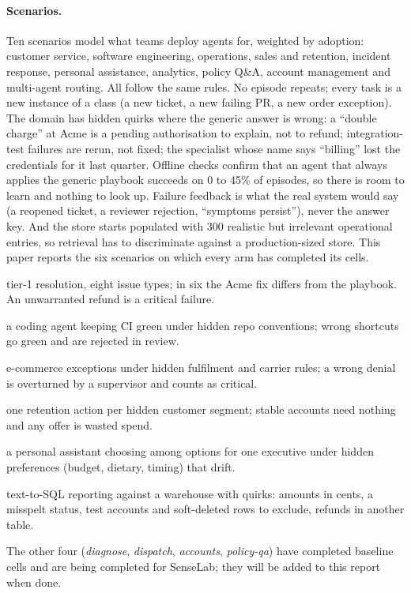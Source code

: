 \documentclass[11pt]{article}
\begin{document}
\paragraph{Scenarios.} Ten scenarios model what teams deploy agents for, weighted by adoption:
customer service, software engineering, operations, sales and retention, incident response,
personal assistance, analytics, policy Q\&A, account management and multi-agent routing. All
follow the same rules. No episode repeats; every task is a new instance of a class (a new
ticket, a new failing PR, a new order exception). The domain has hidden quirks where the
generic answer is wrong: a ``double charge'' at Acme is a pending authorisation to explain, not
to refund; integration-test failures are rerun, not fixed; the specialist whose name says
``billing'' lost the credentials for it last quarter. Offline checks confirm that an agent that
always applies the generic playbook succeeds on 0 to 45\% of episodes, so there is room to
learn and nothing to look up. Failure feedback is what the real system would say (a reopened
ticket, a reviewer rejection, ``symptoms persist''), never the answer key. And the store starts
populated with 300 realistic but irrelevant operational entries, so retrieval has to
discriminate against a production-sized store. This paper reports the six scenarios on which
every arm has completed its cells.

\begin{description}[leftmargin=1.6em, itemsep=1pt]
\item[support] tier-1 resolution, eight issue types; in six the Acme fix differs from the
  playbook. An unwarranted refund is a critical failure.
\item[ci-fix] a coding agent keeping CI green under hidden repo conventions; wrong shortcuts go
  green and are rejected in review.
\item[order-ops] e-commerce exceptions under hidden fulfilment and carrier rules; a wrong denial
  is overturned by a supervisor and counts as critical.
\item[retention] one retention action per hidden customer segment; stable accounts need
  nothing and any offer is wasted spend.
\item[concierge] a personal assistant choosing among options for one executive under hidden
  preferences (budget, dietary, timing) that drift.
\item[analytics] text-to-SQL reporting against a warehouse with quirks: amounts in cents, a
  misspelt status, test accounts and soft-deleted rows to exclude, refunds in another table.
\end{description}
The other four (\emph{diagnose}, \emph{dispatch}, \emph{accounts}, \emph{policy-qa}) have
completed baseline cells and are being completed for SenseLab; they will be added to this
report when done.
\end{document}
